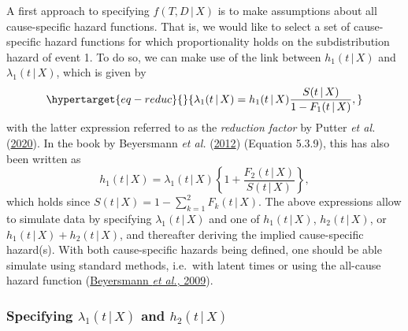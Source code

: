 \documentclass[
  letterpaper,
  DIV=11,
  numbers=noendperiod]{scrreprt}
\newcommand{\given}{\,|\,}
\begin{document}
A first approach to specifying \(f(T, D \given X)\) is to make
assumptions about all cause-specific hazard functions. That is, we would
like to select a set of cause-specific hazard functions for which
proportionality holds on the subdistribution hazard of event 1. To do
so, we can make use of the link between \(h_1(t \given X)\) and
\(\lambda_1(t \given X)\), which is given by
\begin{equation}\protect\hypertarget{eq-reduc}{}{
\lambda_1(t \given X) = h_1(t \given X)\frac{S(t \given X)}{1 - F_1(t \given X)},
}\label{eq-reduc}\end{equation} with the latter expression referred to
as the \textit{reduction factor} by Putter \emph{et al.}
(\protect\hyperlink{ref-putterRelationCausespecificHazard2020}{2020}).
In the book by Beyersmann \emph{et al.}
(\protect\hyperlink{ref-beyersmannCompetingRisksMultistate2012}{2012})
(Equation 5.3.9), this has also been written as \begin{equation*}
    h_1(t \given X) = \lambda_1(t \given X)\left\{1 + \frac{F_2(t \given X)}{S(t \given X)}\right\},
\end{equation*} which holds since
\(S(t \given X) = 1 - \sum_{k=1}^2F_k(t \given X)\). The above
expressions allow to simulate data by specifying
\(\lambda_1(t \given X)\) and one of \(h_1(t \given X)\),
\(h_2(t \given X)\), or \(h_1(t \given X) + h_2(t \given X)\), and
thereafter deriving the implied cause-specific hazard(s). With both
cause-specific hazards being defined, one should be able simulate using
standard methods, i.e.~with latent times or using the all-cause hazard
function
(\protect\hyperlink{ref-beyersmannSimulatingCompetingRisks2009}{Beyersmann
\emph{et al.}, 2009}).

\hypertarget{sec-reduct-int}{%
\subsubsection{\texorpdfstring{Specifying \(\lambda_1(t \given X)\) and
\(h_2(t \given X)\)}{Specifying \textbackslash lambda\_1(t \textbackslash given X) and h\_2(t \textbackslash given X)}}\label{sec-reduct-int}}
\end{document}
